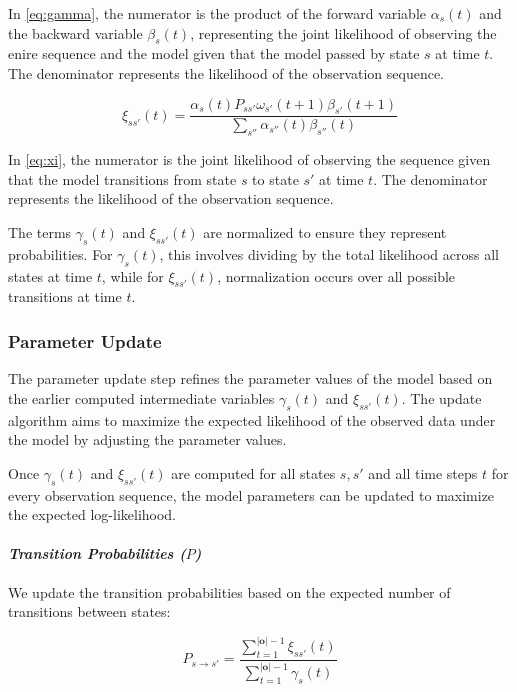 In \autoref{eq:gamma}, the numerator is the product of the forward variable $\alpha_s(t)$ and the backward variable $\beta_s(t)$, representing the joint likelihood of observing the enire sequence and the model given that the model passed by state $s$ at time $t$.
The denominator represents the likelihood of the observation sequence.

\begin{equation}
    \xi_{ss'}(t) = \frac{\alpha_s(t) P_{ss'} \omega_{s'}(t + 1) \beta_{s'}(t + 1)}
    {\sum_{s''}\alpha_{s''}(t) \beta_{s''}(t)}
    \label{eq:xi}
\end{equation}


In \autoref{eq:xi}, the numerator is the joint likelihood of observing the sequence given that the model transitions from state $s$ to state $s'$ at time $t$.
The denominator represents the likelihood of the observation sequence.


The terms $\gamma_s(t)$ and $\xi_{ss'}(t)$ are normalized to ensure they represent probabilities.
For $\gamma_s(t)$, this involves dividing by the total likelihood across all states at time $t$, while for $\xi_{ss'}(t)$, normalization occurs over all possible transitions at time $t$.

\subsubsection{Parameter Update}
The parameter update step refines the parameter values of the model based on the earlier computed intermediate variables $\gamma_s(t)$ and $\xi_{ss'}(t)$.
The update algorithm aims to maximize the expected likelihood of the observed data under the model by adjusting the parameter values.

Once $\gamma_s(t)$ and $\xi_{ss'}(t)$ are computed for all states $s, s'$ and all time steps $t$ for every observation sequence, the model parameters can be updated to maximize the expected log-likelihood.

\paragraph*{\textit{Transition Probabilities ($P$)}}

We update the transition probabilities based on the expected number of transitions between states:


\begin{equation}
    P_{s \rightarrow s'} = \frac{\sum_{t = 1}^{|\mathbf{o}|-1} \xi_{ss'}(t)}{\sum_{t = 1}^{|\mathbf{o}|-1} \gamma_s(t)}
    \label{eq:transition-probabilities}
\end{equation}


